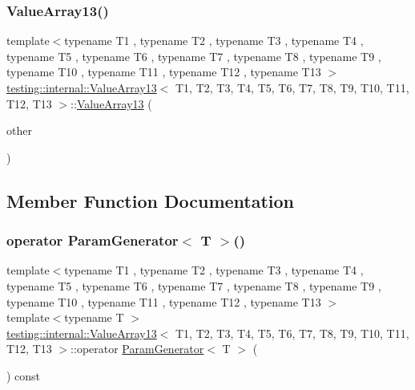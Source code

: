 \subsubsection{\texorpdfstring{ValueArray13()}{ValueArray13()}\hspace{0.1cm}{\footnotesize\ttfamily [2/2]}}
{\footnotesize\ttfamily template$<$typename T1 , typename T2 , typename T3 , typename T4 , typename T5 , typename T6 , typename T7 , typename T8 , typename T9 , typename T10 , typename T11 , typename T12 , typename T13 $>$ \\
\mbox{\hyperlink{classtesting_1_1internal_1_1_value_array13}{testing\+::internal\+::\+Value\+Array13}}$<$ T1, T2, T3, T4, T5, T6, T7, T8, T9, T10, T11, T12, T13 $>$\+::\mbox{\hyperlink{classtesting_1_1internal_1_1_value_array13}{Value\+Array13}} (\begin{DoxyParamCaption}\item[{const \mbox{\hyperlink{classtesting_1_1internal_1_1_value_array13}{Value\+Array13}}$<$ T1, T2, T3, T4, T5, T6, T7, T8, T9, T10, T11, T12, T13 $>$ \&}]{other }\end{DoxyParamCaption})\hspace{0.3cm}{\ttfamily [inline]}}



\subsection{Member Function Documentation}
\mbox{\label{classtesting_1_1internal_1_1_value_array13_a80572fc9c66a20824ae0934785b41f24}} 
\subsubsection{\texorpdfstring{operator ParamGenerator$<$ T $>$()}{operator ParamGenerator< T >()}}
{\footnotesize\ttfamily template$<$typename T1 , typename T2 , typename T3 , typename T4 , typename T5 , typename T6 , typename T7 , typename T8 , typename T9 , typename T10 , typename T11 , typename T12 , typename T13 $>$ \\
template$<$typename T $>$ \\
\mbox{\hyperlink{classtesting_1_1internal_1_1_value_array13}{testing\+::internal\+::\+Value\+Array13}}$<$ T1, T2, T3, T4, T5, T6, T7, T8, T9, T10, T11, T12, T13 $>$\+::operator \mbox{\hyperlink{classtesting_1_1internal_1_1_param_generator}{Param\+Generator}}$<$ T $>$ (\begin{DoxyParamCaption}{ }\end{DoxyParamCaption}) const\hspace{0.3cm}{\ttfamily [inline]}}

